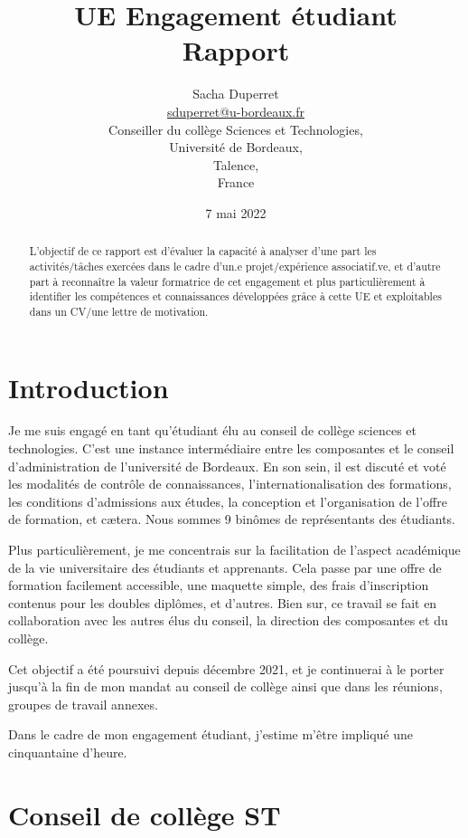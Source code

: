 \documentclass{article}
\title{{\huge UE Engagement étudiant\\Rapport}}
\author{$ $\\{\LARGE Sacha Duperret}\\ $ $\\ \href{mailto:sduperret@u-bordeaux.fr}{sduperret@u-bordeaux.fr}\\Conseiller du collège Sciences et Technologies,\\Université de Bordeaux,\\Talence,\\France}
\date{7 mai 2022}
\begin{document}
\maketitle

\vspace{20pt}

\tableofcontents

\vspace{50pt}

\begin{abstract}
L'objectif de ce rapport est d'évaluer la capacité à analyser d’une part les activités/tâches exercées dans le cadre d'un.e projet/expérience associatif.ve, et d’autre part à reconnaître la valeur formatrice de cet engagement et plus particulièrement à identifier les compétences et connaissances développées grâce à cette UE et exploitables dans un CV/une lettre de motivation.
\end{abstract}

\newpage \section*{Introduction}

Je me suis engagé en tant qu'étudiant élu au conseil de collège sciences et technologies. C'est une instance intermédiaire entre les composantes et le conseil d'administration de l'université de Bordeaux. En son sein, il est discuté et voté les modalités de contrôle de connaissances, l'internationalisation des formations, les conditions d'admissions aux études, la conception et l'organisation de l'offre de formation, et cætera. Nous sommes 9 binômes de représentants des étudiants.

Plus particulièrement, je me concentrais sur la facilitation de l'aspect académique de la vie universitaire des étudiants et apprenants. Cela passe par une offre de formation facilement accessible, une maquette simple, des frais d'inscription contenus pour les doubles diplômes, et d'autres. Bien sur, ce travail se fait en collaboration avec les autres élus du conseil, la direction des composantes et du collège.

Cet objectif a été poursuivi depuis décembre 2021, et je continuerai à le porter jusqu'à la fin de mon mandat au conseil de collège ainsi que dans les réunions, groupes de travail annexes.

\newpage
Dans le cadre de mon engagement étudiant, j'estime m'être impliqué une cinquantaine d'heure.

\section{Conseil de collège ST}
\end{document}
